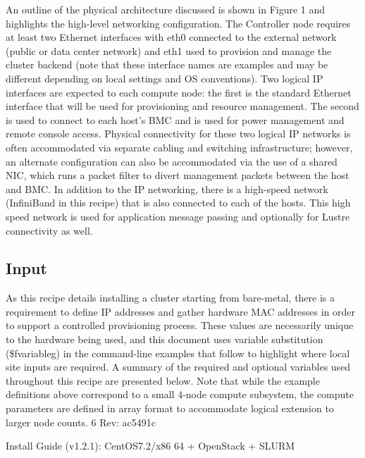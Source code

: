\documentclass[12pt]{article}
\begin{document}
An outline of the physical architecture discussed is shown in Figure 1 and highlights the high-level
networking configuration. The Controller node requires at least two Ethernet interfaces with eth0 connected to
the external network (public or data center network) and eth1 used to provision and manage the cluster backend (note that these interface names are examples and may be different depending on local settings and OS conventions). Two logical IP interfaces are expected to each compute node: the first is the standard Ethernet interface that
will be used for provisioning and resource management. The second is used to connect to each host’s BMC
and is used for power management and remote console access. Physical connectivity for these two logical
IP networks is often accommodated via separate cabling and switching infrastructure; however, an alternate
configuration can also be accommodated via the use of a shared NIC, which runs a packet filter to divert
management packets between the host and BMC.
In addition to the IP networking, there is a high-speed network (InfiniBand in this recipe) that is also
connected to each of the hosts. This high speed network is used for application message passing and optionally
for Lustre connectivity as well.

\subsection*{Input}
As this recipe details installing a cluster starting from bare-metal, there is a requirement to define IP addresses and gather hardware MAC addresses in order to support a controlled provisioning process. These
values are necessarily unique to the hardware being used, and this document uses variable substitution 
(\$fvariableg) in the command-line examples that follow to highlight where local site inputs are required.
A summary of the required and optional variables used throughout this recipe are presented below. Note
that while the example definitions above correspond to a small 4-node compute subsystem, the compute
parameters are defined in array format to accommodate logical extension to larger node counts.
6 Rev: ac5491c

\begin{bash}{Install Guide (v1.2.1): CentOS7.2/x86 64 + OpenStack + SLURM}
\end{bash}
\end{document}
